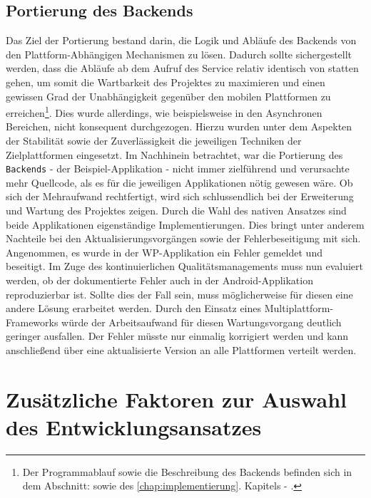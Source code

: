 \documentclass[Bachelorarbeit.tex]{subfiles}
\begin{document}
\subsection*{Portierung des Backends}
Das Ziel der Portierung bestand darin, die Logik und Abläufe des  Backends von den Plattform-Abhängigen Mechanismen zu lösen.
Dadurch sollte sichergestellt werden, dass die Abläufe ab dem Aufruf des Service relativ identisch von statten gehen, um somit die Wartbarkeit des Projektes zu maximieren und einen gewissen Grad der Unabhängigkeit gegenüber den mobilen Plattformen zu erreichen\footnote{Der Programmablauf sowie die Beschreibung des Backends befinden sich in dem Abschnitt:  sowie  des \ref{chap:implementierung}. Kapitels - .}.
Dies wurde allerdings, wie beispielsweise in den Asynchronen Bereichen, nicht konsequent durchgezogen. 
Hierzu wurden unter dem Aspekten der Stabilität sowie der Zuverlässigkeit die jeweiligen Techniken der Zielplattformen eingesetzt.
Im Nachhinein betrachtet, war die Portierung des \texttt{Backends} - der Beispiel-Applikation - nicht immer zielführend und verursachte  mehr Quellcode, als es für die jeweiligen Applikationen nötig gewesen wäre.
Ob sich der Mehraufwand rechtfertigt, wird sich schlussendlich bei der Erweiterung und Wartung des Projektes zeigen. 
Durch die Wahl des nativen Ansatzes sind beide Applikationen eigenständige Implementierungen. 
Dies bringt unter anderem Nachteile bei den Aktualisierungsvorgängen sowie der Fehlerbeseitigung mit sich.
Angenommen, es wurde in der \ac{WP}-Applikation ein Fehler gemeldet und beseitigt.
Im Zuge des kontinuierlichen Qualitätsmanagements muss nun evaluiert werden, ob der dokumentierte Fehler auch in der Android-Applikation reproduzierbar ist.
Sollte dies der Fall sein, muss möglicherweise für diesen eine andere Lösung erarbeitet werden.  
Durch den Einsatz eines Multiplattform-Frameworks würde der Arbeitsaufwand für diesen Wartungsvorgang deutlich geringer ausfallen.
Der Fehler müsste nur einmalig korrigiert werden und kann anschließend über eine aktualisierte Version an alle Plattformen verteilt werden. 


\section[Auswahl des Entwicklungsansatzes]{Zusätzliche Faktoren zur Auswahl des Entwicklungsansatzes}\label{sec:auswahl-des-entwicklungsansatzes}
\end{document}
